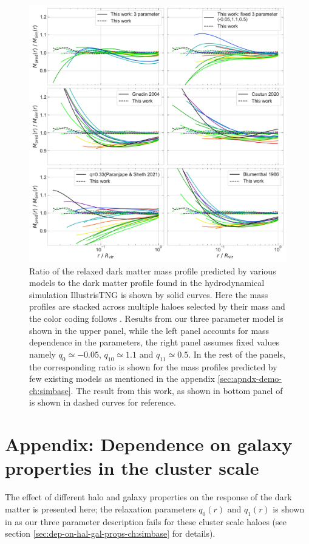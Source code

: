\begin{figure}
    \centering
    \includegraphics[width=0.85\linewidth]{plots/relxn_model_comparison.pdf}
    \caption{Ratio of the relaxed dark matter mass profile predicted by various models to the dark matter profile found in the hydrodynamical simulation IllustrisTNG is shown by solid curves. Here the mass profiles are stacked across multiple haloes selected by their mass and the color coding follows . Results from our three parameter model  is shown in the upper panel, while the left panel accounts for mass dependence in the parameters, the right panel assumes fixed values namely $q_0\simeq-0.05$, $q_{10}\simeq1.1$ and $q_{11}\simeq0.5$. In the rest of the panels, the corresponding ratio is shown for the mass profiles predicted by few existing models as mentioned in the appendix \ref{sec:apndx-demo-ch:simbase}. The result from this work, as shown in bottom panel of  is shown in dashed curves for reference.}
    \label{fig:relxn_models_compare-ch:simbase}
\end{figure}


\section{Appendix: Dependence on galaxy properties in the cluster scale}
The effect of different halo and galaxy properties on the response of the dark matter is presented here; the relaxation parameters $q_0(r)$ and $q_1(r)$ is shown in  as our three parameter description fails for these cluster scale haloes (see section \ref{sec:dep-on-hal-gal-props-ch:simbase} for details).

